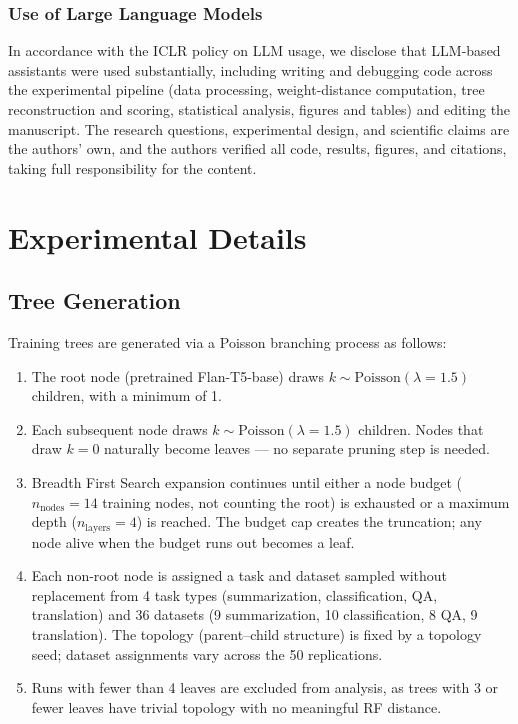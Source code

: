 \documentclass{article}
\theoremstyle{definition}
\theoremstyle{plain}
\begin{document}
\subsubsection*{Use of Large Language Models}
In accordance with the ICLR policy on LLM usage, we disclose that LLM-based assistants were used
substantially, including writing and debugging code across the experimental pipeline (data processing,
weight-distance computation, tree reconstruction and scoring, statistical analysis, figures and tables)
and editing the manuscript. The research questions, experimental design, and scientific claims are the
authors' own, and the authors verified all code, results, figures, and citations, taking full
responsibility for the content.





\appendix

\section{Experimental Details}
\label{app:details}

\subsection*{Tree Generation}
\label{app:tree-gen}

Training trees are generated via a Poisson branching process as follows:

\begin{enumerate}
    \item The root node (pretrained Flan-T5-base) draws $k \sim \mathrm{Poisson}(\lambda = 1.5)$ children, with a minimum of 1.
    \item Each subsequent node draws $k \sim \mathrm{Poisson}(\lambda = 1.5)$ children. Nodes that draw $k = 0$ naturally become leaves --- no separate pruning step is needed.
    \item Breadth First Search expansion continues until either a node budget ($n_\mathrm{nodes} = 14$ training nodes, not counting the root) is exhausted or a maximum depth ($n_\mathrm{layers} = 4$) is reached. The budget cap creates the truncation; any node alive when the budget runs out becomes a leaf.
    \item Each non-root node is assigned a task and dataset sampled without replacement from 4 task types (summarization, classification, QA, translation) and 36 datasets (9 summarization, 10 classification, 8 QA, 9 translation). The topology (parent--child structure) is fixed by a topology seed; dataset assignments vary across the 50 replications.
    \item Runs with fewer than 4 leaves are excluded from analysis, as trees with 3 or fewer leaves have trivial topology with no meaningful RF distance.
\end{enumerate}
\end{document}
